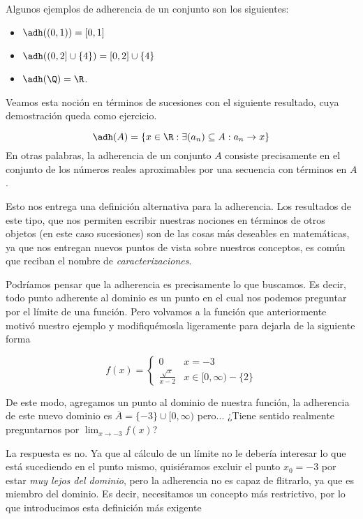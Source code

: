 \begin{example}
    Algunos ejemplos de adherencia de un conjunto son los siguientes:
    \begin{itemize}
        \item $\adh((0, 1)) = [0, 1]$
        \item $\adh((0, 2] \cup \{4\}) = [0, 2] \cup \{4\}$
        \item $\adh(\Q) = \R$.
    \end{itemize}
\end{example}

Veamos esta noción en términos de sucesiones con el siguiente resultado, cuya demostración queda como ejercicio.

\begin{proposition}
    \[\adh(A) = \{x \in \R : \exists (a_n) \subseteq A : a_n \to x\}\]
    En otras palabras, la adherencia de un conjunto $A$ consiste precisamente en el conjunto de los números reales aproximables por una secuencia con términos en $A$.
\end{proposition}

\begin{remark}
    Esto nos entrega una definición alternativa para la adherencia. Los resultados de este tipo, que nos permiten escribir nuestras nociones en términos de otros objetos (en este caso sucesiones) son de las cosas más deseables en matemáticas, ya que nos entregan nuevos puntos de vista sobre nuestros conceptos, es común que reciban el nombre de \textit{caracterizaciones}.
\end{remark}

Podríamos pensar que la adherencia es precisamente lo que buscamos. Es decir, todo punto adherente al dominio es un punto en el cual nos podemos preguntar por el límite de una función. Pero volvamos a la función que anteriormente motivó nuestro ejemplo y modifiquémosla ligeramente para dejarla de la siguiente forma

\[f(x) = \begin{cases}
    0 & x = -3\\
    \frac{\sqrt{x}}{x - 2} & x \in [0, \infty) - \{2\}
\end{cases}\]

De este modo, agregamos un punto al dominio de nuestra función, la adherencia de este nuevo dominio es $\overline{A} = \{-3\} \cup [0, \infty)$ pero... ¿Tiene sentido realmente preguntarnos por $\lim_{x \to -3}f(x)$?

La respuesta es no. Ya que al cálculo de un límite no le debería interesar lo que está sucediendo en el punto mismo, quisiéramos excluir el punto $x_0 = -3$ por estar \textit{muy lejos del dominio}, pero la adherencia no es capaz de flitrarlo, ya que es miembro del dominio. Es decir, necesitamos un concepto más restrictivo, por lo que introducimos esta definición más exigente

